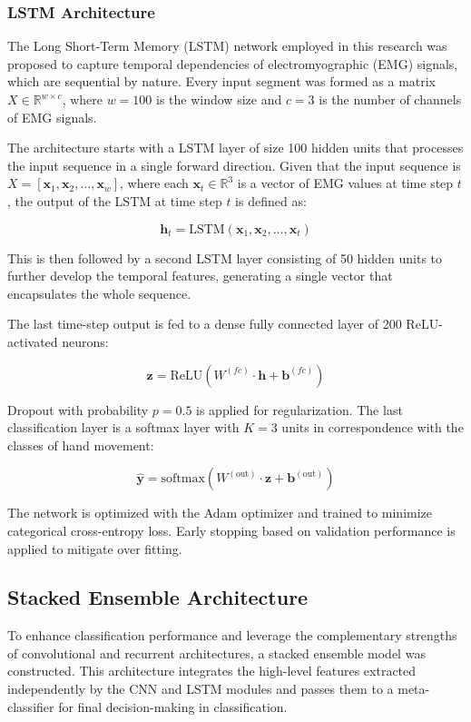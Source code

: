\documentclass{elektr}
\begin{document}
\subsubsection{LSTM Architecture}

The Long Short-Term Memory (LSTM) network employed in this research was proposed to capture temporal dependencies of electromyographic (EMG) signals, which are sequential by nature. Every input segment was formed as a matrix $X \in \mathbb{R}^{w \times c}$, where $w = 100$ is the window size and $c = 3$ is the number of channels of EMG signals.

The architecture starts with a LSTM layer of size 100 hidden units that processes the input sequence in a single forward direction. Given that the input sequence is $X = [\mathbf{x}_1, \mathbf{x}_2, \ldots, \mathbf{x}_w]$, where each $\mathbf{x}_t \in \mathbb{R}^3$ is a vector of EMG values at time step $t$, the output of the LSTM at time step $t$ is defined as:

\[
\mathbf{h}_t = \text{LSTM}(\mathbf{x}_1, \mathbf{x}_2, \ldots, \mathbf{x}_t)
\]

This is then followed by a second LSTM layer consisting of 50 hidden units to further develop the temporal features, generating a single vector that encapsulates the whole sequence.

The last time-step output is fed to a dense fully connected layer of 200 ReLU-activated neurons:

\[
\mathbf{z} = \text{ReLU}(W^{(fc)} \cdot \mathbf{h} + \mathbf{b}^{(fc)})
\]

Dropout with probability $p = 0.5$ is applied for regularization. The last classification layer is a softmax layer with $K = 3$ units in correspondence with the classes of hand movement:

\[
\hat{\mathbf{y}} = \text{softmax}(W^{(\text{out})} \cdot \mathbf{z} + \mathbf{b}^{(\text{out})})
\]

The network is optimized with the Adam optimizer and trained to minimize categorical cross-entropy loss. Early stopping based on validation performance is applied to mitigate over fitting.
\subsection{Stacked Ensemble Architecture}
To enhance classification performance and leverage the complementary strengths of convolutional and recurrent architectures, a stacked ensemble model was constructed. This architecture integrates the high-level features extracted independently by the CNN and LSTM modules and passes them to a meta-classifier for final decision-making in classification.
\end{document}
